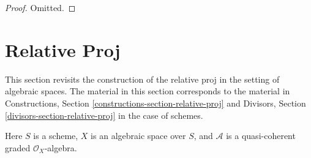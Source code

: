 \begin{proof}
Omitted.
\end{proof}










\section{Relative Proj}
\label{section-relative-proj}

\noindent
This section revisits the construction of the relative proj
in the setting of algebraic spaces. The material in this section
corresponds to the material in Constructions, Section
\ref{constructions-section-relative-proj}
and Divisors, Section \ref{divisors-section-relative-proj}
in the case of schemes.

\begin{situation}
\label{situation-relative-proj}
Here $S$ is a scheme, $X$ is an algebraic space over $S$, and
$\mathcal{A}$ is a quasi-coherent graded $\mathcal{O}_X$-algebra.
\end{situation}

